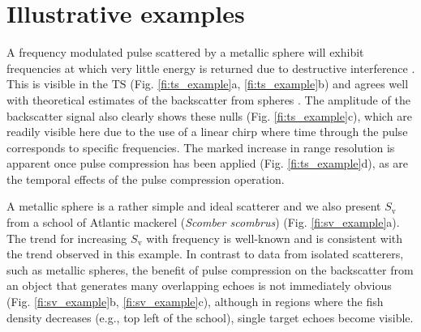 \documentclass[preprint,12pt,TurnOnLineNumbers]{JASAnew}
\newcommand{\ts}{\textrm{TS}}
\newcommand{\sv}{S_{\textrm{v}}}
\begin{document}
\section{Illustrative examples}

A frequency modulated pulse scattered by a metallic sphere will exhibit frequencies at which very little energy is returned due to destructive interference \citep{stanton2008}. This is visible in the $\ts$ (Fig. \ref{fi:ts_example}a, \ref{fi:ts_example}b) and agrees well with theoretical estimates of the backscatter from spheres \citep{maclennan1981}. The amplitude of the backscatter signal also clearly shows these nulls (Fig. \ref{fi:ts_example}c), which are readily visible here due to the use of a linear chirp where time through the pulse corresponds to specific frequencies. The marked increase in range resolution is apparent once pulse compression has been applied (Fig. \ref{fi:ts_example}d), as are the temporal effects of the pulse compression operation.

A metallic sphere is a rather simple and ideal scatterer and we also present $\sv$ from a school of Atlantic mackerel (\textit{Scomber scombrus}) (Fig. \ref{fi:sv_example}a). The trend for increasing $\sv$ with frequency is well-known \citep{korneliussen2010} and is consistent with the trend observed in this example. In contrast to data from isolated scatterers, such as metallic spheres, the benefit of pulse compression on the backscatter from an object that generates many overlapping echoes is not immediately obvious (Fig. \ref{fi:sv_example}b, \ref{fi:sv_example}c), although in regions where the fish density decreases (e.g., top left of the school), single target echoes become visible.
\end{document}
